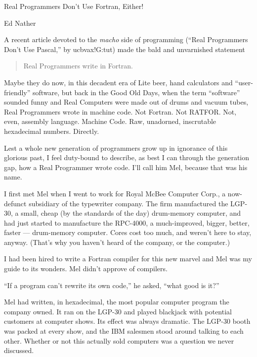\documentclass[12pt]{article}
\begin{document}
\begin{center}
{\Large Real Programmers Don't Use Fortran, Either!}

\bigskip
Ed Nather
\end{center}

\bigskip
A recent article devoted to the {\it macho} side of programming
(``Real Programmers Don't Use Pascal,'' by ucbvax!G:tut)
made the bald and unvarnished statement

\begin{quote}
Real Programmers write in Fortran.
\end{quote}

Maybe they do now, in this decadent era of Lite beer, hand
calculators and ``user-friendly'' software, but back in the
Good Old Days, when the term ``software'' sounded funny and
Real Computers were made out of drums and vacuum tubes, Real
Programmers wrote in machine code. Not Fortran. Not RATFOR.
Not, even, assembly language. Machine Code. Raw,
unadorned, inscrutable hexadecimal numbers. Directly.

\bigskip
Lest a whole new generation of programmers grow up in
ignorance of this glorious past, I feel duty-bound to
describe, as best I can through the generation gap, how a
Real Programmer wrote code. I'll call him Mel, because that
was his name.

\bigskip
I first met Mel when I went to work for Royal McBee Computer
Corp., a now-defunct subsidiary of the typewriter company.
The firm manufactured the LGP-30, a small, cheap (by the
standards of the day) drum-memory computer, and had just
started to manufacture the RPC-4000, a much-improved,
bigger, better, faster --- drum-memory computer. Cores cost
too much, and weren't here to stay, anyway. (That's why you
haven't heard of the company, or the computer.)

\bigskip
I had been hired to write a Fortran compiler for this new
marvel and Mel was my guide to its wonders. Mel didn't
approve of compilers.

\bigskip
``If a program can't rewrite its own code,'' he asked, ``what
good is it?''

\bigskip
Mel had written, in hexadecimal, the most popular computer
program the company owned. It ran on the LGP-30 and played
blackjack with potential customers at computer shows. Its
effect was always dramatic. The LGP-30 booth was packed at
every show, and the IBM salesmen stood around talking to
each other. Whether or not this actually sold computers was
a question we never discussed.
\end{document}
